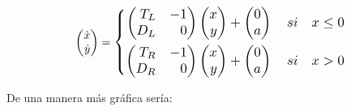 \documentclass[12pt,a4paper]{report} %
\begin{document}
	\begin{equation}
		\begin{pmatrix*}[r]
			\dot{x} \\ \dot{y}
		\end{pmatrix*}=
		\label{eq:lienardrl}
		\scalebox{1.2}{$\displaystyle
			\left\{
			\begin{aligned}
				\begin{pmatrix*}[r]
					T_L & -1\\
					D_L & 0
				\end{pmatrix*}\begin{pmatrix*}[r]
					x \\ y
				\end{pmatrix*}+\begin{pmatrix}
					0\\a
				\end{pmatrix} \quad si \quad x\leq 0 \\
				\begin{pmatrix*}[r]
					T_R & -1\\
					D_R & 0
				\end{pmatrix*}\begin{pmatrix*}[r]
					x \\ y
				\end{pmatrix*}+\begin{pmatrix}
					0\\a
				\end{pmatrix} \quad si \quad x > 0
			\end{aligned}
			\right. 
			$}
	\end{equation}\smallskip
	
	De una manera más gráfica sería:
	
\end{document}
